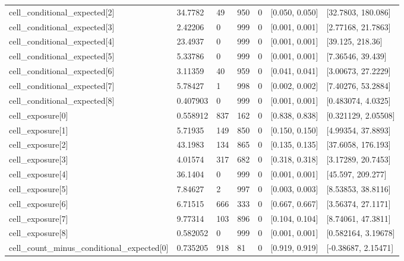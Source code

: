 \begin{longtable}
{}cell\_\allowbreak{}conditional\_\allowbreak{}expected[2] & 34.7782 & 49 & 950 & 0 & [0.050, 0.050] & [32.7803, 180.086] \\
{}cell\_\allowbreak{}conditional\_\allowbreak{}expected[3] & 2.42206 & 0 & 999 & 0 & [0.001, 0.001] & [2.77168, 21.7863] \\
{}cell\_\allowbreak{}conditional\_\allowbreak{}expected[4] & 23.4937 & 0 & 999 & 0 & [0.001, 0.001] & [39.125, 218.36] \\
{}cell\_\allowbreak{}conditional\_\allowbreak{}expected[5] & 5.33786 & 0 & 999 & 0 & [0.001, 0.001] & [7.36546, 39.439] \\
{}cell\_\allowbreak{}conditional\_\allowbreak{}expected[6] & 3.11359 & 40 & 959 & 0 & [0.041, 0.041] & [3.00673, 27.2229] \\
{}cell\_\allowbreak{}conditional\_\allowbreak{}expected[7] & 5.78427 & 1 & 998 & 0 & [0.002, 0.002] & [7.40276, 53.2884] \\
{}cell\_\allowbreak{}conditional\_\allowbreak{}expected[8] & 0.407903 & 0 & 999 & 0 & [0.001, 0.001] & [0.483074, 4.0325] \\
{}cell\_\allowbreak{}exposure[0] & 0.558912 & 837 & 162 & 0 & [0.838, 0.838] & [0.321129, 2.05508] \\
{}cell\_\allowbreak{}exposure[1] & 5.71935 & 149 & 850 & 0 & [0.150, 0.150] & [4.99354, 37.8893] \\
{}cell\_\allowbreak{}exposure[2] & 43.1983 & 134 & 865 & 0 & [0.135, 0.135] & [37.6058, 176.193] \\
{}cell\_\allowbreak{}exposure[3] & 4.01574 & 317 & 682 & 0 & [0.318, 0.318] & [3.17289, 20.7453] \\
{}cell\_\allowbreak{}exposure[4] & 36.1404 & 0 & 999 & 0 & [0.001, 0.001] & [45.597, 209.277] \\
{}cell\_\allowbreak{}exposure[5] & 7.84627 & 2 & 997 & 0 & [0.003, 0.003] & [8.53853, 38.8116] \\
{}cell\_\allowbreak{}exposure[6] & 6.71515 & 666 & 333 & 0 & [0.667, 0.667] & [3.56374, 27.1171] \\
{}cell\_\allowbreak{}exposure[7] & 9.77314 & 103 & 896 & 0 & [0.104, 0.104] & [8.74061, 47.3811] \\
{}cell\_\allowbreak{}exposure[8] & 0.582052 & 0 & 999 & 0 & [0.001, 0.001] & [0.582164, 3.19678] \\
{}cell\_\allowbreak{}count\_\allowbreak{}minus\_\allowbreak{}conditional\_\allowbreak{}expected[0] & 0.735205 & 918 & 81 & 0 & [0.919, 0.919] & [-0.38687, 2.15471] \\

\end{longtable}
